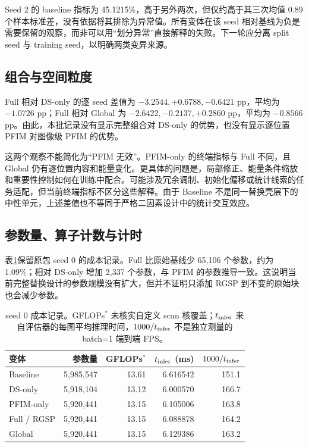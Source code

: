 \documentclass[UTF8,11pt,a4paper,fontset=fandol]{ctexart}
\begin{document}
Seed 2 的 baseline 指标为 45.1215\%，高于另外两次，但仅约高于其三次均值 0.89 个样本标准差，没有依据将其排除为异常值。所有变体在该 seed 相对基线为负是需要保留的观察，而非可以用“划分异常”直接解释的失败。下一轮应分离 split seed 与 training seed，以明确两类变异来源。

\subsection{组合与空间粒度}
Full 相对 DS-only 的逐 seed 差值为 $-3.2544,+0.6788,-0.6421$ pp，平均为 $-1.0726$ pp；Full 相对 Global 为 $-2.6422,-0.2137,+0.2860$ pp，平均为 $-0.8566$ pp。由此，本批记录没有显示完整组合对 DS-only 的优势，也没有显示逐位置 PFIM 对图像级 PFIM 的优势。

这两个观察不能简化为“PFIM 无效”。PFIM-only 的终端指标与 Full 不同，且 Global 仍有逐位置内容和能量变化。更具体的问题是，局部修正、能量条件缩放和重要性控制如何在训练中配合。可能涉及冗余调制、初始化偏移或统计线索的任务适配，但当前终端指标不区分这些解释。由于 Baseline 不是同一替换壳层下的中性单元，上述差值也不等同于严格二因素设计中的统计交互效应。

\subsection{参数量、算子计数与计时}
表\ref{tab:efficiency}保留原包 seed 0 的成本记录。Full 比原始基线少 65,106 个参数，约为 1.09\%；相对 DS-only 增加 2,337 个参数，与 PFIM 的参数推导一致。这说明当前完整替换设计的参数规模没有扩大，但并不证明只添加 RGSP 到不变的原始块也会减少参数。

\begin{table}[!htbp]\centering\small
\caption{seed 0 成本记录。GFLOPs$^\ast$ 未核实自定义 scan 核覆盖；$t_{\rm infer}$ 来自评估器的每图平均推理时间，$1000/t_{\rm infer}$ 不是独立测量的 batch=1 端到端 FPS。}
\label{tab:efficiency}
\begin{tabular}{lrrrr}
\toprule
变体 & 参数量 & GFLOPs$^\ast$ & $t_{\rm infer}$ (ms) & $1000/t_{\rm infer}$\\
\midrule
Baseline & 5,985,547 & 13.61 & 6.616542 & 151.1\\
DS-only & 5,918,104 & 13.12 & 6.000570 & 166.7\\
PFIM-only & 5,920,441 & 13.15 & 6.105006 & 163.8\\
Full / RGSP & 5,920,441 & 13.15 & 6.088878 & 164.2\\
Global & 5,920,441 & 13.15 & 6.129386 & 163.2\\
\bottomrule
\end{tabular}
\end{table}
\end{document}
